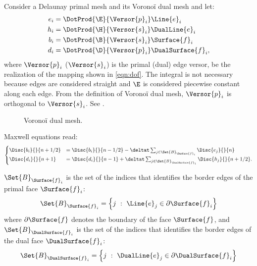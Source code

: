 Consider a Delaunay primal mesh and its Vorono\"i dual mesh and let:
\begin{align} \label{eqn:voronoi_dof}
e_i & = \DotProd{\E}{\Versor{p}_i} \Line{e}_i \\
h_i & = \DotProd{\H}{\Versor{s}_i} \DualLine{e}_i \\
b_i & = \DotProd{\B}{\Versor{s}_i} \Surface{f}_i \\
d_i & = \DotProd{\D}{\Versor{p}_i} \DualSurface{f}_i,
\end{align}
where $\Versor{p}_i$ ($\Versor{s}_i$) is the primal (dual) edge
versor, be the realization of the mapping shown in
\eqref{eqn:dof}. The integral is not necessary because edges are
considered straight and $\E$ is considered piecewise constant along each
edge. From the definition of Vorono\"i dual mesh, $\Versor{p}_i$ is
orthogonal to $\Versor{s}_i$. See .

\begin{figure}[htbp]
  \begin{center}
  \end{center}
  \caption{Vorono\"i dual mesh.}
  \label{fig:voronoi}
\end{figure}

Maxwell equations read:
\begin{equation} \label{eqn:voronoi_maxwell} \begin{cases}
    \Disc{b_i}{}{n+1/2} & = \Disc{b_i}{}{n-1/2} - \deltat \sum_{j \in
    \Set{B}_{\Surface{f}_i}} \Disc{e_j}{}{n} \\
    \Disc{d_i}{}{n+1} & = \Disc{d_i}{}{n-1} + \deltat \sum_{j \in
    \Set{B}_{\DualSurface{f}_i}} \Disc{h_j}{}{n+1/2}.
  \end{cases} \end{equation}

$\Set{B}_{\Surface{f}_i}$ is the set of the indices that identifies the border
edges of the primal face $\Surface{f}_i$:
\begin{equation*}
  \Set{B}_{\Surface{f}_i} = \left\{ j\ :\ \Line{e}_j \in \partial \Surface{f}_i \right\}
\end{equation*}
where $\partial \Surface{f}$ denotes the boundary of the face $\Surface{f}$, and
$\Set{B}_{\DualSurface{f}_i}$ is the set of the indices that identifies the border
edges of the dual face $\DualSurface{f}_i$:
\begin{equation*}
  \Set{B}_{\DualSurface{f}_i} = \left\{ j\ :\ \DualLine{e}_j \in \partial \DualSurface{f}_i \right\}
\end{equation*}

